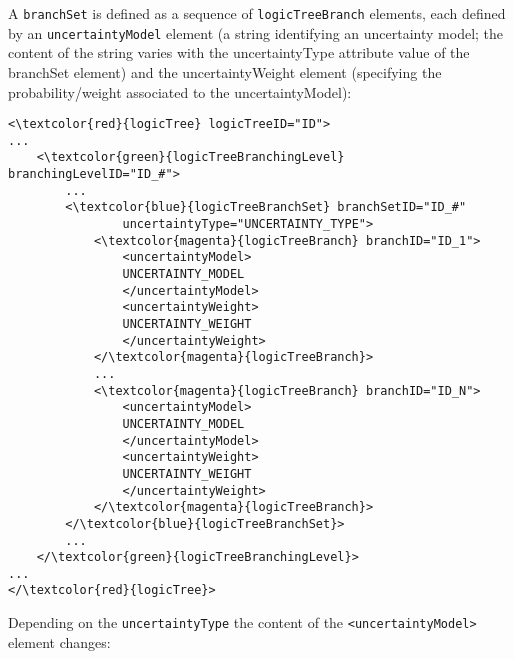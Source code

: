 A \Verb+branchSet+ is defined as a sequence of  \Verb+logicTreeBranch+ elements, each defined by an \Verb+uncertaintyModel+ element (a string identifying an uncertainty model; the content of the string varies with the uncertaintyType attribute value of the branchSet element) and the uncertaintyWeight element (specifying the probability/weight associated to the uncertaintyModel):
\begin{Verbatim}[frame=single, commandchars=\\\{\}, samepage=true]
<\textcolor{red}{logicTree} logicTreeID="ID">
...
	<\textcolor{green}{logicTreeBranchingLevel} branchingLevelID="ID_#">
		...
		<\textcolor{blue}{logicTreeBranchSet} branchSetID="ID_#"
				uncertaintyType="UNCERTAINTY_TYPE">
			<\textcolor{magenta}{logicTreeBranch} branchID="ID_1">
				<uncertaintyModel>
				UNCERTAINTY_MODEL
				</uncertaintyModel>
				<uncertaintyWeight>
				UNCERTAINTY_WEIGHT
				</uncertaintyWeight>
			</\textcolor{magenta}{logicTreeBranch}>
			...
			<\textcolor{magenta}{logicTreeBranch} branchID="ID_N">
				<uncertaintyModel>
				UNCERTAINTY_MODEL
				</uncertaintyModel>
				<uncertaintyWeight>
				UNCERTAINTY_WEIGHT
				</uncertaintyWeight>
			</\textcolor{magenta}{logicTreeBranch}>
		</\textcolor{blue}{logicTreeBranchSet}>
		...
	</\textcolor{green}{logicTreeBranchingLevel}>
...
</\textcolor{red}{logicTree}>
\end{Verbatim}
Depending on the \Verb+uncertaintyType+ the content of the \Verb+<uncertaintyModel>+ element changes:
